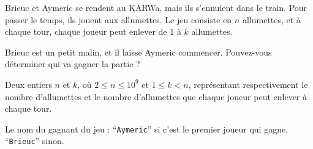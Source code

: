 \problemname{\problemyamlname}

Brieuc et Aymeric se rendent au KARWa, mais ils s'ennuient dans le train. Pour passer le temps, ils jouent aux allumettes. Le jeu consiste en $n$ allumettes,
et à chaque tour, chaque joueur peut enlever de 1 à $k$ allumettes.

Brieuc est un petit malin, et il laisse Aymeric commencer. Pouvez-vous déterminer qui va gagner la partie ?

\begin{Input}
	Deux entiers $n$ et $k$, où $2 \le n \le 10^9$ et $1 \le k < n$, représentant respectivement le nombre d'allumettes et le nombre d'allumettes que chaque joueur peut enlever à chaque tour.
\end{Input}

\begin{Output}
	Le nom du gagnant du jeu : ``\verb|Aymeric|'' si c'est le premier joueur qui gagne, ``\verb|Brieuc|'' sinon.
\end{Output}
